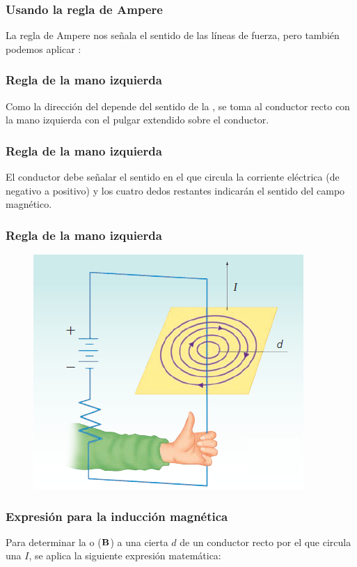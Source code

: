 \documentclass[14pt]{beamer}
\begin{document}
\begin{frame}
\frametitle{Usando la regla de Ampere}
La regla de Ampere nos señala el sentido de las líneas de fuerza, pero también podemos aplicar :
\end{frame}
\begin{frame}
\frametitle{Regla de la mano izquierda}
Como la dirección del  depende del sentido de la , \pause se toma al conductor recto con la mano izquierda con el pulgar extendido sobre el conductor.
\end{frame}
\begin{frame}
\frametitle{Regla de la mano izquierda}
El conductor debe señalar el sentido en el que circula la corriente eléctrica (de negativo a positivo) y
los cuatro dedos restantes indicarán el sentido del campo magnético.
\end{frame}
\begin{frame}
\frametitle{Regla de la mano izquierda}
\begin{figure}
    \centering
    \includegraphics[scale=0.6]{Imagenes/Electromagnetismo_06.png}
\end{figure}
\end{frame}
\begin{frame}
\frametitle{Expresión para la inducción magnética}
Para determinar la  o  ($\vb{B}$) \pause a una cierta  $d$ de un conductor recto \pause por el que circula una  $I$, se aplica la siguiente expresión matemática:
\end{frame}
\end{document}
